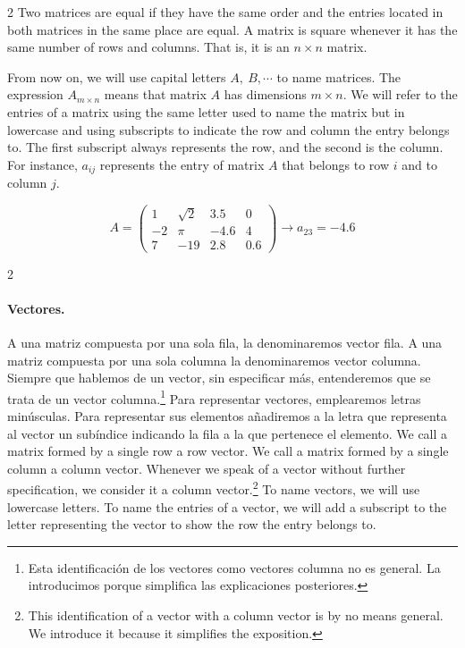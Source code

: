 \begin{paracol}{2}
Two matrices are equal if they have the same order and the entries located in both matrices in the same place are equal. A matrix is square whenever it has the same number of rows and columns. That is, it is an $n\times n$ matrix.

From now on, we will use capital letters $A,\ B,\cdots$ to name matrices. The expression $A_{m\times n}$ means that matrix $A$ has dimensions $m\times n$. We will refer to the entries of a matrix using the same letter used to name the matrix but in lowercase and using subscripts to indicate the row and column the entry belongs to. The first subscript always represents the row, and the second is the column. For instance, $a_{ij}$ represents the entry of matrix $A$ that belongs to row $i$ and to column $j$.
\end{paracol}
\begin{equation*}
A=
\begin{pmatrix}
1& \sqrt{2}& 3.5& 0\\
-2& \pi& -4.6& 4\\
7& -19& 2.8& 0.6
\end{pmatrix}
\rightarrow a_{23}=-4.6
\end{equation*}
\begin{paracol}{2}
\paragraph{Vectores.}
A una matriz compuesta por una sola fila, la denominaremos vector fila. A una matriz compuesta por una sola columna la denominaremos vector columna. Siempre que hablemos de un vector, sin especificar más, entenderemos que se trata de un vector columna.\footnote{Esta identificación de los vectores como vectores columna no es general. La introducimos porque simplifica las explicaciones posteriores.} Para representar vectores, emplearemos letras minúsculas. Para representar sus elementos añadiremos a la letra que representa al vector un subíndice indicando la fila a la que pertenece el elemento.
\switchcolumn
We call a matrix formed by a single row a row vector. We call a matrix formed by a single column a column vector. Whenever we speak of a vector without further specification, we consider it a column vector.\footnote{This identification of a vector with a column vector is by no means general. We introduce it because it simplifies the exposition.} To name vectors, we will use lowercase letters. To name the entries of a vector, we will add a subscript to the letter representing the vector to show the row the entry belongs to. 
\end{paracol}
